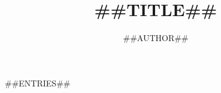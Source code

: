 
\renewcommand{\startEntry}[1][]{} %
\renewcommand{\finishEntry}[1][]{} %
\graphicspath{ {##PATH_TO_IMAGE_FOLDER##/} }
\def\DONOTUSERELATIVEPATHS{0}



\author{##AUTHOR##}
\title{##TITLE##}
\maketitle
\tableofcontents

##ENTRIES##


